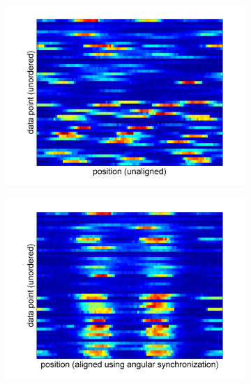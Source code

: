 \documentclass[10pt]{article}
\begin{document}
\begin{figure}[!ht]
\begin{subfigure}{0.3\textwidth}
\includegraphics[width=\textwidth]{data_unaligned_unordered}
\caption{}
\end{subfigure}
\begin{subfigure}{0.3\textwidth}
\includegraphics[width=\textwidth]{data_aligned_unordered}
\caption{}
\end{subfigure}
\begin{subfigure}{0.3\textwidth}

\end{subfigure}
\end{figure}
\end{document}
